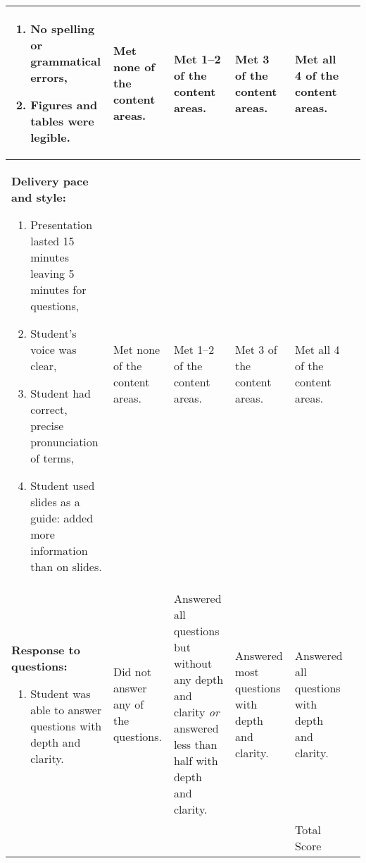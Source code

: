 \documentclass[10pt, twoside]{article}
\begin{document}
\begin{landscape}
{\begin{longtable}[l]{@{}L{5cm}L{3.5cm}L{3.5cm}L{3.5cm}L{3.5cm}L{1.9cm}@{}}
\begin{enumerate}[itemsep=-0.25\baselineskip,align=left, leftmargin=*]
\item No spelling or grammatical errors,\par%
\item Figures and tables were legible.\end{enumerate}&%
Met none of the content areas. &%
Met 1--2 of the content areas. &%
Met 3 of the content areas. &%
Met all 4 of the content areas.&%
\\[-1em]
\midrule
\textbf{Delivery pace and style:}\par%
\vspace{-0.5\baselineskip}
\begin{enumerate}[itemsep=-0.25\baselineskip,align=left, leftmargin=*]
\item Presentation lasted 15 minutes leaving 5 minutes for questions, \par%
\item Student’s voice was clear, \par%
\item Student had correct, precise pronunciation of terms,\par%
\item Student used slides as a guide: added more information than on slides.\end{enumerate}&%
Met none of the content areas. &%
Met 1--2 of the content areas. &%
Met 3 of the content areas. &%
Met all 4 of the content areas.&%
\\[-1em]
\midrule
\textbf{Response to questions:}\par%
\vspace{-0.5\baselineskip}
\begin{enumerate}[itemsep=-0.25\baselineskip,align=left, leftmargin=*]
\item Student was able to answer questions with depth and clarity.\end{enumerate}&%
Did not answer any of the questions. &%
Answered all questions but without any depth and clarity \emph{or} answered less than half with depth and clarity. &%
Answered most questions with depth and clarity. &%
Answered all questions with depth and clarity.&%
\\
\midrule
& & & & \vspace{0.5in}\par\hfill\normalsize{Total Score\phantom{m}} & \\
\bottomrule
\end{longtable}
}%

\end{landscape}
\end{document}

